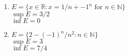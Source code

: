 \documentclass[a4paper]{article}
\newcommand{\real}{\mathbb{R}}
\begin{document}
\begin{flushleft}
\begin{enumerate}
\begin{enumerate}
                \item
                $ E = \{x \in \real : x = 1/n + {-1}^n \text{ for }n\in \mathbb{N} \}$\\
                $\sup E = 3/2$ \\
                $\inf E = 0$

                \item
                $E = \{2 - {(-1)}^n / n^2 : n\in \mathbb{N} \}$\\
                $\sup E = 3$ \\ 
                $\inf E = 7/4$

            \end{enumerate}
            
        \end{enumerate}
    \end{flushleft}
\end{document}
